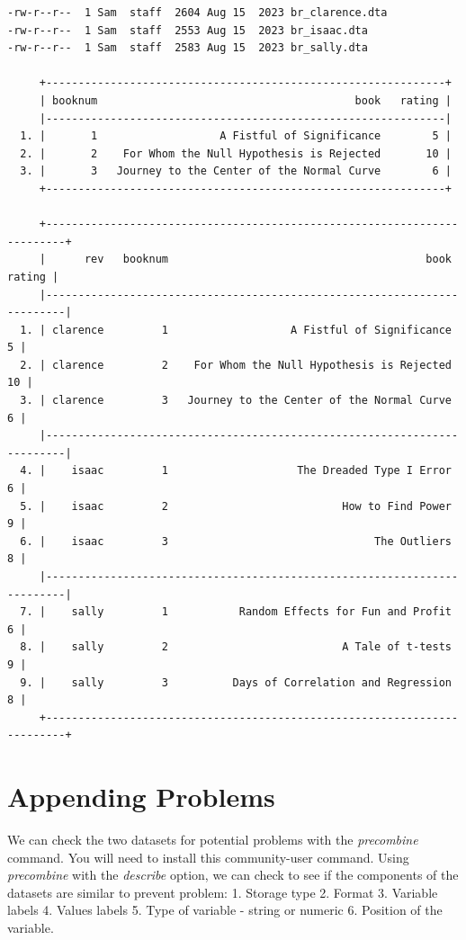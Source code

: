 \documentclass[
]{book}
\begin{document}
\begin{verbatim}
-rw-r--r--  1 Sam  staff  2604 Aug 15  2023 br_clarence.dta
-rw-r--r--  1 Sam  staff  2553 Aug 15  2023 br_isaac.dta
-rw-r--r--  1 Sam  staff  2583 Aug 15  2023 br_sally.dta

     +--------------------------------------------------------------+
     | booknum                                        book   rating |
     |--------------------------------------------------------------|
  1. |       1                   A Fistful of Significance        5 |
  2. |       2    For Whom the Null Hypothesis is Rejected       10 |
  3. |       3   Journey to the Center of the Normal Curve        6 |
     +--------------------------------------------------------------+

     +-------------------------------------------------------------------------+
     |      rev   booknum                                        book   rating |
     |-------------------------------------------------------------------------|
  1. | clarence         1                   A Fistful of Significance        5 |
  2. | clarence         2    For Whom the Null Hypothesis is Rejected       10 |
  3. | clarence         3   Journey to the Center of the Normal Curve        6 |
     |-------------------------------------------------------------------------|
  4. |    isaac         1                    The Dreaded Type I Error        6 |
  5. |    isaac         2                           How to Find Power        9 |
  6. |    isaac         3                                The Outliers        8 |
     |-------------------------------------------------------------------------|
  7. |    sally         1           Random Effects for Fun and Profit        6 |
  8. |    sally         2                           A Tale of t-tests        9 |
  9. |    sally         3          Days of Correlation and Regression        8 |
     +-------------------------------------------------------------------------+
\end{verbatim}

\section{Appending Problems}\label{appending-problems}

We can check the two datasets for potential problems with the \emph{precombine} command. You will need to install this community-user command. Using \emph{precombine} with the \emph{describe} option, we can check to see if the components of the datasets are similar to prevent problem:
1. Storage type
2. Format
3. Variable labels
4. Values labels
5. Type of variable - string or numeric
6. Position of the variable.
\end{document}
